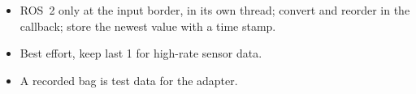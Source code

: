 \begin{keyidea}
\begin{itemize}[nosep]
  \item ROS~2 only at the input border, in its own thread; convert and reorder in the callback; store the newest value with a time stamp.
  \item Best effort, keep last 1 for high-rate sensor data.
  \item A recorded bag is test data for the adapter.
\end{itemize}
\end{keyidea}
